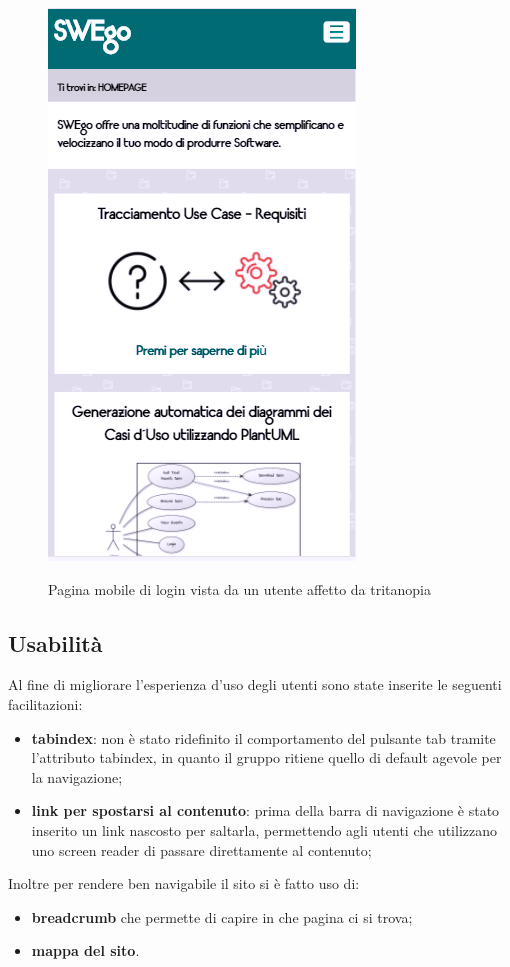 	\begin{figure}
	\centering
		\includegraphics[scale=0.8]{img/tritanopia_mobile.png}\\[1cm] \caption{Pagina mobile di login vista da un utente affetto da tritanopia}
	\end{figure}
	\newpage
\subsection{Usabilità}
Al fine di migliorare l'esperienza d'uso degli utenti sono state inserite le seguenti facilitazioni:
\begin{itemize}
	\item \textbf{tabindex}: non è stato ridefinito il comportamento del pulsante tab tramite l'attributo tabindex, in quanto il gruppo ritiene quello di default agevole per la navigazione;
	\item \textbf{link per spostarsi al contenuto}: prima della barra di navigazione è stato inserito un link nascosto per saltarla, permettendo agli utenti che utilizzano uno screen reader di passare direttamente al contenuto;
\end{itemize}
Inoltre per rendere ben navigabile il sito si è fatto uso di:
\begin{itemize}
	\item \textbf{breadcrumb} che permette di capire in che pagina ci si trova;
	\item \textbf{mappa del sito}.
\end{itemize}


